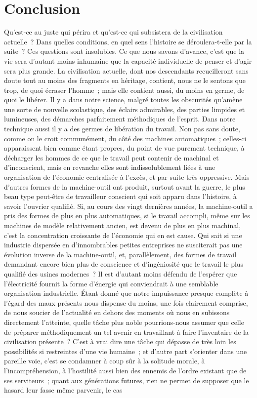 \documentclass[french,twoside]{book} %
\begin{document}
\section[{Conclusion}]{Conclusion}\renewcommand{\leftmark}{Conclusion}

\noindent \par
Qu'est-ce au juste qui périra et qu'est-ce qui subsistera de la civilisation actuelle ? Dans quelles conditions, en quel sens l'histoire se déroulera-t-elle par la suite ? Ces questions sont insolubles. Ce que nous savons d'avance, c'est que la vie sera d'autant moins inhumaine que la capacité individuelle de penser et d'agir sera plus grande. La civilisation actuelle, dont nos descendants recueilleront sans doute tout au moins des fragments en héritage, contient, nous ne le sentons que trop, de quoi écraser l'homme ; mais elle contient aussi, du moins en germe, de quoi le libérer. Il y a dans notre science, malgré toutes les obscurités qu'amène une sorte de nouvelle scolastique, des éclairs admirables, des parties limpides et lumineuses, des démarches parfaitement méthodiques de l'esprit. Dans notre technique aussi il y a des germes de libération du travail. Non pas sans doute, comme on le croit communément, du côté des machines automatiques ; celles-ci apparaissent bien comme étant propres, du point de vue purement technique, à décharger les hommes de ce que le travail peut contenir de machinal et d'inconscient, mais en revanche elles sont indissolublement liées à une organisation de l'économie centralisée à l'excès, et par suite très oppressive. Mais d'autres formes de la machine-outil ont produit, surtout avant la guerre, le plus beau type peut-être de travailleur conscient qui soit apparu dans l'histoire, à savoir l'ouvrier qualifié. Si, au cours des vingt dernières années, la machine-outil a pris des formes de plus en plus automatiques, si le travail accompli, même sur les machines de modèle relativement ancien, est devenu de plus en plus machinal, c'est la concentration croissante de l'économie qui en est cause. Qui sait si une industrie dispersée en d'innombrables petites entreprises ne susciterait pas une évolution inverse de la machine-outil, et, parallèlement, des formes de travail demandant encore bien plus de conscience et d'ingéniosité que le travail le plus qualifié des usines modernes ? Il est d'autant moins défendu de l'espérer que l'électricité fournit la forme d'énergie qui conviendrait à une semblable organisation industrielle. Étant donné que notre impuissance presque complète à l'égard des maux présents nous dispense du moins, une fois clairement comprise, de nous soucier de l'actualité en dehors des moments où nous en subissons directement l'atteinte, quelle tâche plus noble pourrions-nous assumer que celle de préparer méthodiquement un tel avenir en travaillant à faire l'inventaire de la civilisation présente ? C'est à vrai dire une tâche qui dépasse de très loin les possibilités si restreintes d'une vie humaine ; et d'autre part s'orienter dans une pareille voie, c'est se condamner à coup sûr à la solitude morale, à l'incompréhension, à l'hostilité aussi bien des ennemis de l'ordre existant que de ses serviteurs ; quant aux générations futures, rien ne permet de supposer que le hasard leur fasse même parvenir, le cas 
\end{document}
